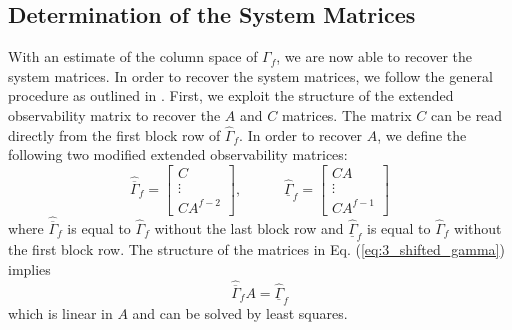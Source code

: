 \subsection{Determination of the System Matrices}\label{sec:3_system_matrices}
With an estimate of the column space of $\Gamma_f$, we are now able to recover the system matrices. In order to recover the system matrices, we follow the general procedure as outlined in \cite{katayama2005subspace}. First, we exploit the structure of the extended observability matrix to recover the $A$ and $C$ matrices. The matrix $C$ can be read directly from the first block row of $\hat{\Gamma}_f$. In order to recover $A$, we define the following two modified extended observability matrices:
\begin{equation}\label{eq:3_shifted_gamma}
\hat{\overline{\Gamma}}_f = \begin{bmatrix}C\\ \vdots \\ CA^{f-2}\end{bmatrix}, \hspace{3em}
\hat{\underline{\Gamma}}_f = \begin{bmatrix}CA\\ \vdots \\ CA^{f-1}\end{bmatrix}
\end{equation}
where $\hat{\overline{\Gamma}}_f$ is equal to $\hat{\Gamma}_f$ without the last block row and $\hat{\underline{\Gamma}}_f$ is equal to $\hat{\Gamma}_f$ without the first block row. The structure of the matrices in Eq. (\ref{eq:3_shifted_gamma}) implies
\begin{equation}
\hat{\overline{\Gamma}}_f A = \hat{\underline{\Gamma}}_f
\end{equation}
which is linear in $A$ and can be solved by least squares.

